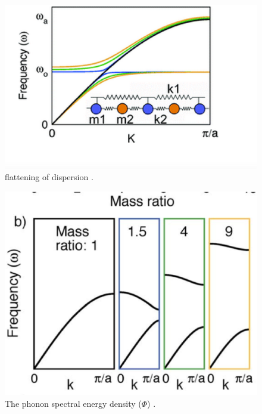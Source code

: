 \documentclass[letterpaper,12pt]{article}
\begin{document}
\begin{figure}
\begin{center}
\includegraphics[scale=0.5]{flat_dispersion.eps}
\vspace*{-5mm}
\end{center}
\caption{\label{F:PEAK_COMPARE} flattening of dispersion .}
\end{figure}

\begin{figure}
\begin{center}
\includegraphics[scale=0.5]{vg_mass_ratio.eps}
\vspace*{-5mm}
\end{center}
\caption{\label{F:PEAK_COMPARE} The phonon spectral energy density ($\Phi$) .}
\end{figure}
\end{document}

